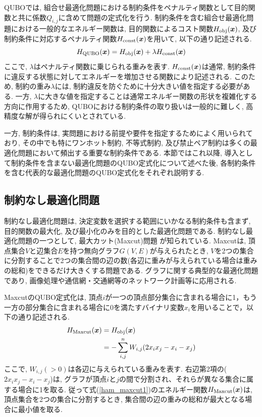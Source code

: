 \documentclass[submit,techrep,noauthor]{ipsj}
\begin{document}
QUBOでは, 組合せ最適化問題における制約条件をペナルティ関数として目的関数と共に係数$Q_{i,j}$に含めて問題の定式化を行う. 制約条件を含む組合せ最適化問題における一般的なエネルギー関数は, 目的関数によるコスト関数$H_{\rm{obj}}(\bm{x})$, 及び制約条件に対応するペナルティ関数$H_{\rm{const}}(\bm{x})$を用いて, 以下の通り記述される.
\begin{equation}
H_{\rm{QUBO}}(\bm{x}) = H_{\rm{obj}}(\bm{x}) + \lambda H_{\rm{const}}(\bm{x})
\label{H_qubo}
\end{equation}
ここで, $\lambda$はペナルティ関数に乗じられる重みを表す. $H_{\rm{const}}(\bm{x})$は通常, 制約条件に違反する状態に対してエネルギーを増加させる関数により記述される. このため, 制約の重み$\lambda$には, 制約違反を防ぐために十分大きい値を指定する必要がある. 一方, $\lambda$に大きな値を指定することは通常エネルギー関数の形状を複雑化する方向に作用するため, QUBOにおける制約条件の取り扱いは一般的に難しく, 高精度な解が得られにくいとされている\cite{kumagai, komatsu, kumagai2}. 

一方, 制約条件は, 実問題における前提や要件を指定するためによく用いられており, その中でも特にワンホット制約, 不等式制約, 及び禁止ペア制約は多くの最適化問題において頻出する重要な制約条件である. 本節ではこれ以降, 導入として制約条件を含まない最適化問題のQUBO定式化について述べた後, 各制約条件を含む代表的な最適化問題のQUBO定式化をそれぞれ説明する.

\subsection{制約なし最適化問題}

制約なし最適化問題は, 決定変数を選択する範囲にいかなる制約条件も含まず, 目的関数の最大化, 及び最小化のみを目的とした最適化問題である. 制約なし最適化問題の一つとして, 最大カット(Maxcut)問題 が知られている. Maxcutは, 頂点集合$V$と辺集合$E$を持つ無向グラフ$G(V,E)$が与えられたとき, $V$を2つの集合に分割することで2つの集合間の辺の数(各辺に重みが与えられている場合は重みの総和)をできるだけ大きくする問題である\cite{maxcut}. グラフに関する典型的な最適化問題であり, 画像処理や通信網・交通網等のネットワーク計画等に応用される.

MaxcutのQUBO定式化は, 頂点$i$が一つの頂点部分集合に含まれる場合に1，もう一方の部分集合に含まれる場合に0を満たすバイナリ変数$x_{i}$を用いることで，以下の通り記述される. 
\begin{align}
H_{\rm{Maxcut}}(\bm{x}) &= H_{\rm{obj}}(\bm{x})\nonumber\\
&= -\sum_{i,j}^{n}W_{i,j}(2x_{i}x_{j}-x_{i}-x_{j})
\label{ham_maxcut1}
\end{align}
ここで, $W_{i,j}(>0)$は各辺に与えられている重みを表す. 右辺第2項の($2x_{i}x_{j}-x_{i}-x_{j}$)は, グラフが頂点$i$と$j$の間で分割され、それらが異なる集合に属する場合に1を取る. 従って式(\ref{ham_maxcut1})のエネルギー関数$H_{\rm{Maxcut}}(\bm{x})$は, 頂点集合を2つの集合に分割するとき, 集合間の辺の重みの総和が最大となる場合に最小値を取る.
\end{document}
